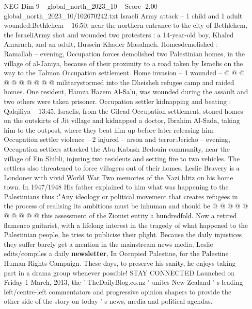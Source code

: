 \begin{textsample}{NEG Dim 9 – global\_north\_2023\_10 – Score -2.00 – global\_north\_2023\_10/102670242.txt}
Israeli Army attack -- 1 child and 1 adult wounded:Bethlehem -- 16:50, near the northern entrance to the city of Bethlehem, the IsraeliArmy shot and wounded two protesters : a 14-year-old boy, Khaled Amarneh, and an adult, Hussein Khader Masalmeh.
Homesdemolished : Ramallah -- evening, Occupation forces demolished two Palestinian homes, in the village of al-Janiya, because of their proximity to a road taken by Israelis on the way to the Talmon Occupation settlement.
Home invasion -- 1 wounded -- @ @ @ @ @ @ @ @ @ @ militarystormed into the Dheisheh refugee camp and raided homes.
One resident, Hamza Hazem Al-Sa'u, was wounded during the assault and two others were taken prisoner.
Occupation settler kidnapping and beating : Qalqiliya -- 13:45, Israelis, from the Gilead Occupation settlement, stoned homes on the outskirts of Jit village and kidnapped a doctor, Ibrahim Al-Sada, taking him to the outpost, where they beat him up before later releasing him.
Occupation settler violence -- 2 injured -- arson and terror:Jericho -- evening, Occupation settlers attacked the Abu Kabash Bedouin community, near the village of Ein Shibli, injuring two residents and setting fire to two vehicles.
The settlers also threatened to force villagers out of their homes.
Leslie Bravery is a Londoner with vivid World War Two memories of the Nazi blitz on his home town.
In 1947/1948 His father explained to him what was happening to the Palestinians thus :"Any ideology or political movement that creates refugees in the process of realising its ambitions must be inhuman and should be @ @ @ @ @ @ @ @ @ @ this assessment of the Zionist entity a hundredfold.
Now a retired flamenco guitarist, with a lifelong interest in the tragedy of what happened to the Palestinian people, he tries to publicise their plight.
Because the daily injustices they suffer barely get a mention in the mainstream news media, Leslie edits/compiles a daily \textbf{newsletter}, In Occupied Palestine, for the Palestine Human Rights Campaign.
These days, to preserve his sanity, he enjoys taking part in a drama group whenever possible!
STAY CONNECTED Launched on Friday 1 March, 2013, the ' TheDailyBlog.co.nz ' unites New Zealand ' s leading left/centre-left commentators and progressive opinion shapers to provide the other side of the story on today ' s news, media and political agendas.

\end{textsample}
